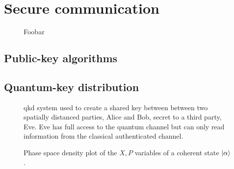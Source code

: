 \section{Secure communication}

\begin{figure}[htb]
	\centering
	
	\caption{Foobar}
\end{figure}


\subsection{Public-key algorithms}



\subsection{Quantum-key distribution}


\begin{figure}[htb]
	\centering
	
	\caption{\Gls{qkd} system used to create a shared key between between two spatially distanced parties, Alice and Bob, secret to a third party, Eve. Eve has full access to the quantum channel but can only read information from the classical authenticated channel.}
\end{figure}


\begin{figure}[htb]
	\centering
	
	\caption{Phase space density plot of the $X,P$ variables of a coherent state $\ket{\alpha}$.}
\end{figure}